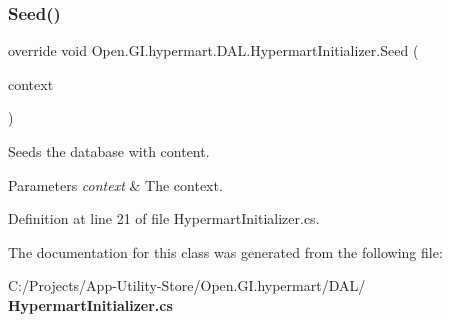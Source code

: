 \subsubsection{Seed()}
{\footnotesize\ttfamily override void Open.\+G\+I.\+hypermart.\+D\+A\+L.\+Hypermart\+Initializer.\+Seed (\begin{DoxyParamCaption}\item[{\textbf{ Hypermart\+Context}}]{context }\end{DoxyParamCaption})\hspace{0.3cm}{\ttfamily [protected]}}



Seeds the database with content. 


\begin{DoxyParams}{Parameters}
{\em context} & The context.\\
\hline
\end{DoxyParams}


Definition at line 21 of file Hypermart\+Initializer.\+cs.



The documentation for this class was generated from the following file\+:\begin{DoxyCompactItemize}
\item 
C\+:/\+Projects/\+App-\/\+Utility-\/\+Store/\+Open.\+G\+I.\+hypermart/\+D\+A\+L/\textbf{ Hypermart\+Initializer.\+cs}\end{DoxyCompactItemize}
